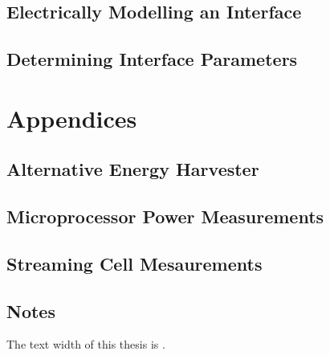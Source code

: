   \chapter{Electrically Modelling an Interface}
    
  \chapter{Determining Interface Parameters}
    

\part{Appendices}
  \appendix
  \chapter{Alternative Energy Harvester}
    
  \chapter{Microprocessor Power Measurements}
    
  \chapter{Streaming Cell Mesaurements}
    

\chapter*{Notes}
The text width of this thesis is \the\textwidth.







